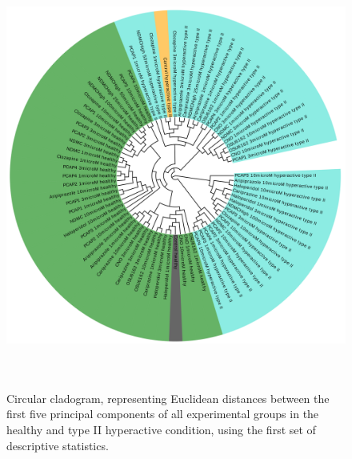 \documentclass[a4paper,12pt]{article}
\begin{document}
\begin{figure}[h!]
\begin{center}
\includegraphics[width=14cm,height=14cm]{DarkPTZ_set1_PCA_tree_A.png}
\caption{Circular cladogram, representing Euclidean distances between the first five principal components of all experimental groups in the healthy and type II hyperactive condition, using the first set of descriptive statistics.}
\end{center}
\end{figure}
\newpage
\end{document}
